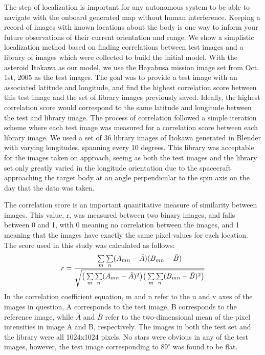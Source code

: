 The step of localization is important for any autonomous system to be able to navigate with the onboard generated map without human interference. Keeping a record of images with known locations about the body is one way to inform your future observations of their current orientation and range. We show a simplistic localization method based on finding correlations between test images and a library of images which were collected to build the initial model. With the asteroid Itokawa as our model, we use the Hayabusa mission image set from Oct. 1st, 2005 as the test images. The goal was to provide a test image with an associated latitude and longitude, and find the highest correlation score between this test image and the set of library images previously saved. Ideally, the highest correlation score would correspond to the same latitude and longitude between the test and library image. The process of correlation followed a simple iteration scheme where each test image was measured for a correlation score between each library image. We used a set of 36 library images of Itokawa generated in Blender with varying longitudes, spanning every 10 degrees. This library was acceptable for the images taken on approach, seeing as both the test images and the library set only greatly varied in the longitude orientation due to the spacecraft approaching the target body at an angle perpendicular to the spin axis on the day that the data was taken. 

The correlation score is an important quantitative measure of similarity between images. This value, r,  was measured between two binary images, and falls between 0 and 1, with 0 meaning no correlation between the images, and 1 meaning that the images have exactly the same pixel values for each location. The score used in this study was calculated as follows:
\begin{equation}
    r = \frac{\sum\limits_m \sum\limits_n (A_{mn} - \Bar{A})(B_{mn} - \Bar{B})}{\sqrt{\big ( \sum\limits_m \sum\limits_n (A_{mn} - \Bar{A})^2 \big ) \big( \sum\limits_m \sum\limits_n (B_{mn}-\bar{B})^2 \big)}}
\end{equation}
In the correlation coefficient equation, m and n refer to the u and v axes of the images in question, A corresponds to the test image, B corresponds to the reference image, while $\bar{A}$ and $\bar{B}$ refer to the two-dimensional mean of the pixel intensities in image A and B, respectively. The images in both the test set and the library were all 1024x1024 pixels. No stars were obvious in any of the test images, however, the test image corresponding to $89^{\circ}$ was found to be flat.


